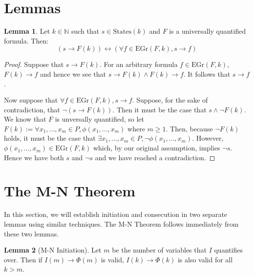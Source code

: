 \documentclass[12pt]{article}
\theoremstyle{definition}
\newtheorem{lemma}{Lemma}
\theoremstyle{remark}
\newcommand{\states}{\text{States}}
\newcommand{\gr}{\text{EGr}}
\begin{document}
\section{Lemmas}
\begin{lemma}
  \label{lem:pnf-ground}
  Let $k \in \mathbb{N}$ such that $s \in \states(k)$ and $F$ is a universally quantified formula.  Then:
  $$(s \rightarrow F(k)) \leftrightarrow (\forall f \in \gr(F,k), s \rightarrow f)$$
\end{lemma}
\begin{proof}
  Suppose that $s \rightarrow F(k)$.  For an arbitrary formula $f \in \gr(F,k)$, $F(k) \rightarrow f$ and hence we see that $s \rightarrow F(k) \land F(k) \rightarrow f$.  It follows that $s \rightarrow f$.

  Now suppose that $\forall f \in \gr(F,k), s \rightarrow f$.  Suppose, for the sake of contradiction, that $\neg(s \rightarrow F(k))$.  Then it must be the case that $s \land \neg F(k)$.  We know that $F$ is unversally quantified, so let $F(k) := \forall x_1,...,x_m \in P, \phi(x_1,...,x_m)$ where $m \geq 1$.  Then, because $\neg F(k)$ holds, it must be the case that $\exists x_1,...,x_m \in P, \neg \phi(x_1,...,x_m)$.  However, $\phi(x_1,...,x_m) \in \gr(F,k)$ which, by our original assumption, implies $\neg s$.  Hence we have both $s$ and $\neg s$ and we have reached a contradiction.
\end{proof}



\section{The M-N Theorem}

In this section, we will establish initiation and consecution in two separate lemmas using similar techniques.  The M-N Theorem follows immediately from these two lemmas.

\begin{lemma}[M-N Initiation]
  Let $m$ be the number of variables that $I$ quantifies over.  Then if $I(m) \rightarrow \Phi(m)$ is valid, $I(k) \rightarrow \Phi(k)$ is also valid for all $k>m$.
\end{lemma}
\end{document}
